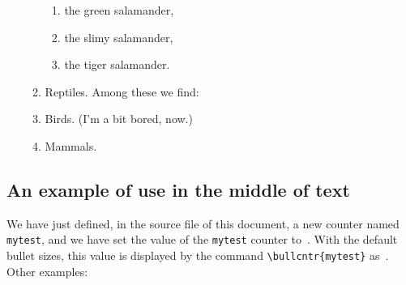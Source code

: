 \documentclass[a4paper]{article}
\DeclareRobustCommand*{\cnt}[1]{\texttt{#1}}
\begin{document}
\begin{enumerate}
\begin{enumerate}
\begin{bullenum}
						\begin{enumerate}
							\item\label{GreenSal}  the green salamander,
							\item\label{SlimySal}  the slimy salamander,
							\item\label{TigerSal}  the tiger salamander.
						\end{enumerate}
				\end{bullenum}
			\item\label{Reptiles}
				Reptiles. Among these we find:
			\item\label{Birds}
				Birds.  (I'm a bit bored, now.)
			\item\label{Mammals}
				Mammals.
		\end{enumerate}
\end{enumerate}



\subsection{An example of use in the middle of text}

\setcounter{mytest}{3}
\newlength{\W}
\setlength{\W}{\bigskipamount}

We have just defined, in the source file of this document, a new
counter named \cnt{mytest}, and we have set the value of the
\cnt{mytest} counter to~.  With the default bullet
sizes, this value is displayed by the command \verb|\bullcntr{mytest}|
as~.  Other examples:
\end{document}

